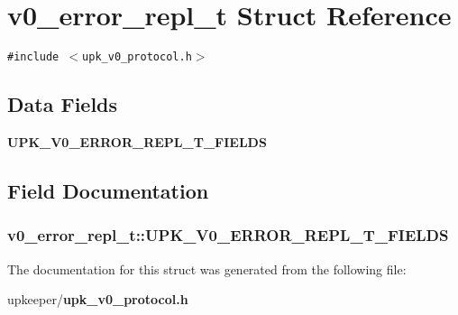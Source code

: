 \section{v0\_\-error\_\-repl\_\-t Struct Reference}
\label{structv0__error__repl__t}
{\tt \#include $<$upk\_\-v0\_\-protocol.h$>$}

\subsection*{Data Fields}
\begin{CompactItemize}
\item 
\bf{UPK\_\-V0\_\-ERROR\_\-REPL\_\-T\_\-FIELDS}
\end{CompactItemize}


\subsection{Field Documentation}
\subsubsection{\setlength{\rightskip}{0pt plus 5cm}\bf{v0\_\-error\_\-repl\_\-t::UPK\_\-V0\_\-ERROR\_\-REPL\_\-T\_\-FIELDS}}\label{structv0__error__repl__t_7510d0f9a770ea30564aadfc63ab7e1a}




The documentation for this struct was generated from the following file:\begin{CompactItemize}
\item 
upkeeper/\bf{upk\_\-v0\_\-protocol.h}\end{CompactItemize}
